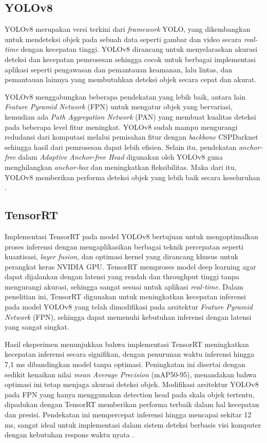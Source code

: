 \subsection{YOLOv8}
YOLOv8 merupakan versi terkini dari \emph{framework} YOLO, yang dikembangkan untuk mendeteksi objek pada sebuah data seperti gambar dan video secara \emph{real-time} dengan kecepatan tinggi. YOLOv8 dirancang untuk menyelaraskan akurasi deteksi dan kecepatan pemrosesan sehingga cocok untuk berbagai implementasi aplikasi seperti pengawasan dan pemantauan keamanan, lalu lintas, dan pemantauan lainnya yang membutuhkan deteksi objek secara cepat dan akurat.

YOLOv8 menggabungkan beberapa pendekatan yang lebih baik, antara lain \emph{Feature Pyramid Network} (FPN) untuk mengatur objek yang bervariasi, kemudian ada \emph{Path Aggregation Network} (PAN) yang membuat kualitas deteksi pada beberapa level fitur meningkat. YOLOv8 sudah mampu mengurangi redudansi dari komputasi melalui pemisahan fitur dengan \emph{backbone} CSPDarknet sehingga hasil dari pemrosesan dapat lebih efisien. Selain itu, pendekatan \emph{anchor-free} dalam \emph{Adaptive Anchor-free Head} digunakan oleh YOLOv8 guna menghilangkan \emph{anchor-box} dan meningkatkan fleksibilitas. Maka dari itu, YOLOv8 memberikan performa deteksi objek yang lebih baik secara keseluruhan \cite{yolov8}.

\subsection{TensorRT}
Implementasi TensorRT pada model YOLOv8 bertujuan untuk mengoptimalkan proses inferensi dengan mengaplikasikan berbagai teknik percepatan seperti kuantisasi, \emph{layer fusion}, dan optimasi kernel yang dirancang khusus untuk perangkat keras NVIDIA GPU. TensorRT memproses model deep learning agar dapat dijalankan dengan latensi yang rendah dan throughput tinggi tanpa mengurangi akurasi, sehingga sangat sesuai untuk aplikasi \emph{real-time}. Dalam penelitian ini, TensorRT digunakan untuk meningkatkan kecepatan inferensi pada model YOLOv8 yang telah dimodifikasi pada arsitektur \emph{Feature Pyramid Network} (FPN), sehingga dapat memenuhi kebutuhan inferensi dengan latensi yang sangat singkat.

Hasil eksperimen menunjukkan bahwa implementasi TensorRT meningkatkan kecepatan inferensi secara signifikan, dengan penurunan waktu inferensi hingga 7,1 ms dibandingkan model tanpa optimasi. Peningkatan ini disertai dengan sedikit kenaikan nilai \emph{mean Average Precision} (mAP50-95), menandakan bahwa optimasi ini tetap menjaga akurasi deteksi objek. Modifikasi arsitektur YOLOv8 pada FPN yang hanya menggunakan detection head pada skala objek tertentu, dipadukan dengan TensorRT memberikan performa terbaik dalam hal kecepatan dan presisi. Pendekatan ini mempercepat inferensi hingga mencapai sekitar 12 ms, sangat ideal untuk implementasi dalam sistem deteksi berbasis visi komputer dengan kebutuhan respons waktu nyata \cite{tensorrt}.


